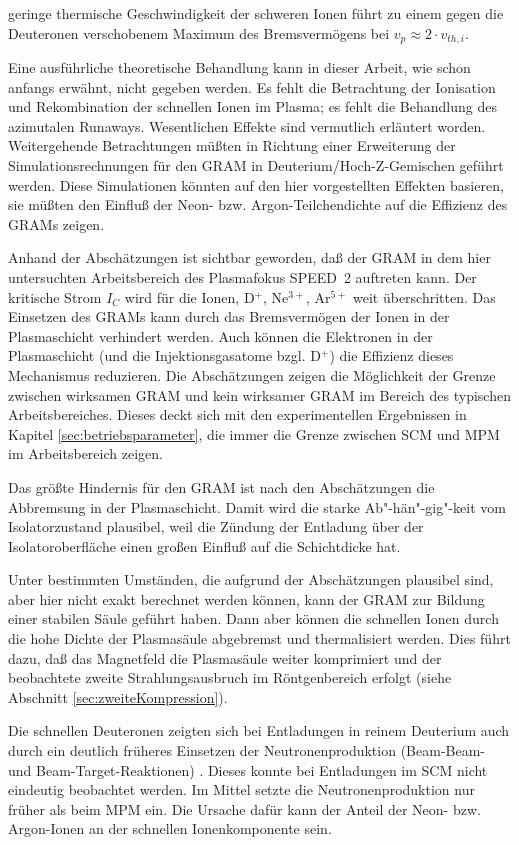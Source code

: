 geringe thermische Geschwindigkeit der schweren Ionen führt zu einem
gegen die Deuteronen verschobenem Maximum des Bremsvermögens bei $v_p
\approx 2 \cdot v_{th,i}$.
%
\par
Eine ausführliche theoretische Behandlung kann in dieser Arbeit, wie
schon anfangs erwähnt, nicht gegeben werden. Es fehlt die Betrachtung
der Ionisation und Rekombination der schnellen Ionen im Plasma; es
fehlt die Behandlung des azimutalen Runaways. Wesentlichen Effekte sind
vermutlich erläutert worden. Weitergehende Betrachtungen müßten in
Richtung einer Erweiterung der Simulationsrechnungen für den GRAM in
Deuterium/Hoch-Z-Gemischen geführt werden. Diese Simulationen könnten
auf den hier vorgestellten Effekten basieren, sie müßten den Einfluß
der Neon- bzw. Argon-Teilchendichte auf die Effizienz des GRAMs zeigen.
\par
Anhand der Abschätzungen ist sichtbar geworden, daß der GRAM in dem
hier untersuchten Arbeitsbereich des Plasmafokus SPEED~2 auftreten
kann. Der kritische Strom $I_C$ wird für die Ionen, D$^+$, Ne$^{3+}$,
Ar$^{5+}$ weit überschritten. Das Einsetzen des GRAMs kann durch das
Bremsvermögen der Ionen in der Plasmaschicht verhindert werden. Auch
können die Elektronen in der Plasmaschicht (und die Injektionsgasatome
bzgl. D$^+$) die Effizienz dieses Mechanismus reduzieren. Die
Abschätzungen zeigen die Möglichkeit der Grenze zwischen wirksamen GRAM
und kein wirksamer GRAM im Bereich des typischen Arbeitsbereiches.
Dieses deckt sich mit den experimentellen Ergebnissen in Kapitel
\ref{sec:betriebsparameter}, die immer die Grenze zwischen SCM und MPM
im Arbeitsbereich zeigen.
\par
Das größte Hindernis für den GRAM ist nach den Abschätzungen die
Abbremsung in der Plasmaschicht. Damit wird die starke
Ab"-hän"-gig"-keit vom Isolatorzustand plausibel, weil die Zündung
der Entladung über der Isolatoroberfläche einen großen Einfluß auf
die Schichtdicke hat.
\par
Unter bestimmten Umständen, die aufgrund der Abschätzungen plausibel
sind, aber hier nicht exakt berechnet werden können, kann der GRAM zur
Bildung einer stabilen Säule geführt haben. Dann aber können die
schnellen Ionen durch die hohe Dichte der Plasmasäule abgebremst und
thermalisiert werden. Dies führt dazu, daß das Magnetfeld die
Plasmasäule weiter komprimiert und der beobachtete zweite
Strahlungsausbruch im Röntgenbereich erfolgt (siehe Abschnitt
\vref{sec:zweiteKompression}).
\par
Die schnellen Deuteronen zeigten sich bei Entladungen in reinem
Deuterium auch durch ein deutlich früheres Einsetzen der
Neutronenproduktion (Beam-Beam- und Beam-Target-Reaktionen)
\cite{deutsch:87}. Dieses konnte bei Entladungen im SCM  nicht
eindeutig beobachtet werden. Im Mittel setzte die Neutronenproduktion
nur  früher als beim MPM ein. Die Ursache dafür kann der
Anteil der Neon- bzw. Argon-Ionen an der schnellen Ionenkomponente
sein.
